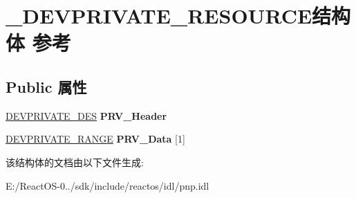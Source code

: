 \hypertarget{struct___d_e_v_p_r_i_v_a_t_e___r_e_s_o_u_r_c_e}{}\section{\+\_\+\+D\+E\+V\+P\+R\+I\+V\+A\+T\+E\+\_\+\+R\+E\+S\+O\+U\+R\+C\+E结构体 参考}
\label{struct___d_e_v_p_r_i_v_a_t_e___r_e_s_o_u_r_c_e}
\subsection*{Public 属性}
\begin{DoxyCompactItemize}
\item 
\mbox{\label{struct___d_e_v_p_r_i_v_a_t_e___r_e_s_o_u_r_c_e_a6275a99f7ecdc131f0e87ba284bd56e4}} 
\hyperlink{struct_dev_private___des__s}{D\+E\+V\+P\+R\+I\+V\+A\+T\+E\+\_\+\+D\+ES} {\bfseries P\+R\+V\+\_\+\+Header}
\item 
\mbox{\label{struct___d_e_v_p_r_i_v_a_t_e___r_e_s_o_u_r_c_e_ac43fd9137cbac96629cb3bafb75b64cd}} 
\hyperlink{struct_dev_private___range__s}{D\+E\+V\+P\+R\+I\+V\+A\+T\+E\+\_\+\+R\+A\+N\+GE} {\bfseries P\+R\+V\+\_\+\+Data} \mbox{[}1\mbox{]}
\end{DoxyCompactItemize}


该结构体的文档由以下文件生成\+:\begin{DoxyCompactItemize}
\item 
E\+:/\+React\+O\+S-\/0../sdk/include/reactos/idl/pnp.\+idl\end{DoxyCompactItemize}
